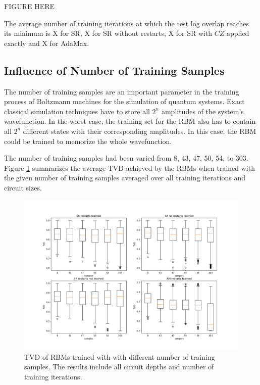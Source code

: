 FIGURE HERE

The average number of training iterations at which the test log overlap reaches its minimum is 
X for SR, X for SR without restarts, X for SR with $CZ$ applied exactly and X for AdaMax.


\subsection{Influence of Number of Training Samples}

The number of training samples are an important parameter in the training process of 
Boltzmann machines for the simulation of quantum systems. Exact classical simulation 
techniques have to store all $2^n$ amplitudes of the system's wavefunction. In the worst 
case, the training set for the RBM also has to contain all $2^n$ different states with 
their corresponding amplitudes. In this case, the RBM could be trained to memorize 
the whole wavefunction. 

The number of training samples had been varied from 8, 43, 47, 50, 54, to 303. 
Figure \ref{fig:samples} summarizes the average TVD achieved by the RBMs when 
trained with the given number of training samples averaged over all training iterations and 
circuit sizes.

\begin{figure}[H]
    \centering
    \includegraphics[width=\textwidth]{figures/samples.png}
    \caption[Influence of Number of Training samples.]{TVD of RBMs trained with 
    with different number of training samples. The results include all circuit depths 
    and number of training iterations.}
    \label{fig:samples}
\end{figure}

